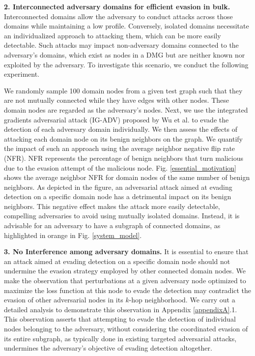\documentclass[conference,compsoc]{IEEEtran}
\begin{document}
\par \textbf{2. Interconnected adversary domains for efficient evasion in bulk.} Interconnected domains allow the adversary to conduct attacks across those domains while maintaining a low profile. Conversely, isolated domains necessitate an individualized approach to attacking them, which can be more easily detectable. Such attacks may impact non-adversary domains connected to the adversary's domains, which exist as nodes in a DMG but are neither known nor exploited by the adversary. To investigate this scenario, we conduct the following experiment.



\par We randomly sample 100 domain nodes from a given test graph such that they are not mutually connected while they have edges with other nodes. These domain nodes are regarded as the adversary's nodes. Next, we use the integrated gradients adversarial attack (IG-ADV) proposed by Wu et al. \cite{wu2019adversarial} to evade the detection of each adversary domain individually. We then assess the effects of attacking each domain node on its benign neighbors on the graph. We quantify the impact of such an approach using the average neighbor negative flip rate (NFR). NFR represents the percentage of benign neighbors that turn malicious due to the evasion attempt of the malicious node. Fig. \ref{essential_motivation} shows the average neighbor NFR for domain nodes of the same number of benign neighbors. As depicted in the figure, an adversarial attack aimed at evading detection on a specific domain node has a detrimental impact on its benign neighbors. This negative effect makes the attack more easily detectable, compelling adversaries to avoid using mutually isolated domains. Instead, it is advisable for an adversary to have a subgraph of connected domains, as highlighted in orange in Fig. \ref{system_model}.



\par \textbf{3. No Interference among adversary domains.} It is essential to ensure that an attack aimed at evading detection on a specific domain node should not undermine the evasion strategy employed by other connected domain nodes. We make the observation that perturbations at a given adversary node optimized to maximize the loss function at this node to evade the detection may contradict the evasion of other adversarial nodes in its $k$-hop neighborhood. We carry out a detailed analysis to demonstrate this observation in Appendix \ref{appendixA}.1. This observation asserts that attempting to evade the detection of individual nodes belonging to the adversary, without considering the coordinated evasion of its entire subgraph, as typically done in existing targeted adversarial attacks, undermines the adversary's objective of evading detection altogether. 
\end{document}
